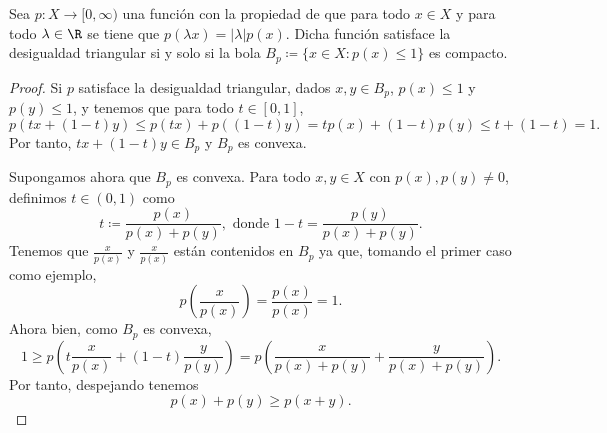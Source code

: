 \begin{proposition}
    Sea $ p \colon X \to [0,\infty) $ una función con la propiedad de que para todo $ x \in X $ y para todo $ \lambda \in \R $ se tiene que $ p(\lambda x) = |\lambda| p(x) $. Dicha función satisface la desigualdad triangular si y solo si la bola  $B_p \coloneq \{ x \in X \colon p(x) \leq 1 \} $ es compacto.
\end{proposition}
\begin{proof}
    Si $ p $ satisface la desigualdad triangular, dados $ x, y \in B_p $, $ p(x) \leq 1 $ y  $ p(y) \leq 1 $, y tenemos que para todo $ t \in [0, 1] $,
    \begin{equation}
        p(tx + (1-t) y) \leq p(tx) + p((1-t)y) = tp(x) + (1-t)p(y) \leq t + (1-t) = 1.
    \end{equation}
    Por tanto, $ tx + (1-t)y \in B_p $ y $ B_p $ es convexa.

    Supongamos ahora que $ B_p $ es convexa. Para todo $ x, y \in X $ con $ p(x), p(y) \neq 0 $, definimos $ t \in (0, 1) $ como
    \begin{equation}
        t \coloneq \frac{p(x)}{p(x) + p(y)}, \text{ donde } 1 - t = \frac{p(y)}{p(x) + p(y)}.
    \end{equation}
    Tenemos que $ \frac{x}{p(x) } $ y $ \frac{x}{p(x) } $ están contenidos en $ B_p $ ya que, tomando el primer caso como ejemplo, 
    \begin{equation}
        p(\frac{x}{p(x)}) = \frac{p(x)}{p(x)} = 1.
    \end{equation}
    Ahora bien, como $ B_p $ es convexa, 
    \begin{equation}
        1 \geq p\left(t \frac{x}{p(x)} + (1-t) \frac{y}{p(y)}\right) = p\left( \frac{x}{p(x)+p(y)} + \frac{y}{p(x)+p(y)} \right).
    \end{equation}
    Por tanto, despejando tenemos
    \begin{equation}
        p(x)+p(y) \geq p(x+y).
    \end{equation}
\end{proof}

